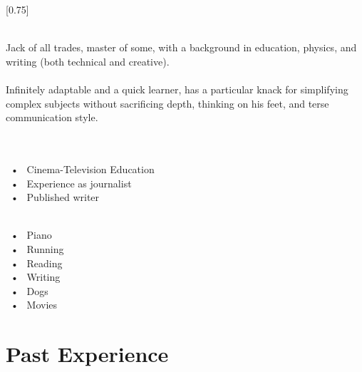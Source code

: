 \documentclass[lighthipster]{simplehipstercv}
\begin{document}
\setlength{\columnsep}{1.5cm}
[0.75]
\begin{paracol}{2}

\paracolbackgroundoptions



\footnotesize
{\setasidefontcolour
\begin{center}
\end{center}
\bigskip
\bigskip
{}\\[0.5em]

Jack of all trades, master of some, with a background in education, physics, and
writing (both technical and creative).\\\\Infinitely adaptable and a quick
learner, has a particular knack for simplifying complex subjects without
sacrificing depth, thinking on his feet, and terse communication style.\\\\

\bigskip

 \\[0.5em]
~•~ Cinema-Television Education\\~•~ Experience as journalist\\~•~ Published
writer

\bigskip

\\[0.5em]
~•~ Piano\\~•~ Running\\~•~ Reading \\~•~ Writing\\~•~ Dogs\\~•~ Movies

\vspace{4em}



\phantom{turn the page}

\phantom{turn the page}
}
\switchcolumn

\small
\section*{Past Experience}


\end{paracol}
\end{document}
